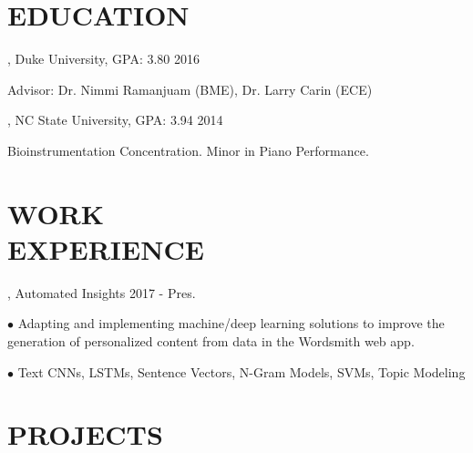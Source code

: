 \documentclass[resmargin, 11pt]{resume_style_class} %
\newenvironment{outline}
  {\begin{list}{}{\setlength{\leftmargin}{30pt}\setlength\itemsep{-2pt}}}
  {\end{list}}
\begin{document}
\begin{resume}


\section{EDUCATION}

, Duke University, GPA: 3.80 \hfill 2016
\begin{outline}
\item Advisor: Dr. Nimmi Ramanjuam (BME), Dr. Larry Carin (ECE)
\end{outline}

, NC State University, GPA: 3.94 \hfill 2014
\begin{outline}
\item Bioinstrumentation Concentration. Minor in Piano Performance.
\end{outline}
 
 
 
\section{WORK \\ EXPERIENCE}
, Automated Insights \hfill 2017 - Pres.
\begin{outline}
\item[$\bullet$\hspace{0.1cm}]  Adapting and implementing machine/deep learning solutions to improve the generation of personalized content from data in the Wordsmith web app.
\item[$\bullet$\hspace{0.1cm}]  Text CNNs, LSTMs, Sentence Vectors, N-Gram Models, SVMs, Topic Modeling
\end{outline} 
 
\section{PROJECTS}


\end{resume}
\end{document}
